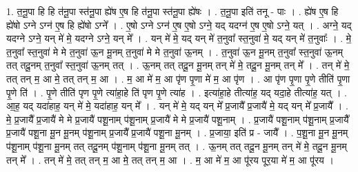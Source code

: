 \documentclass[17pt]{extarticle}
\begin{document}
1. त॒नू॒पा हि हि त॑नू॒पा स्त॑नू॒पा ह्ये॑ष ए॒ष हि त॑नू॒पा स्त॑नू॒पा ह्ये॑षः । . त॒नू॒पा इति॑ तनू - पाः । . ह्ये॑ष ए॒ष हि ह्ये॑षो ऽग्ने ऽग्न॑ ए॒ष हि ह्ये॑षो ऽग्ने᳚ । . ए॒षो ऽग्ने ऽग्न॑ ए॒ष ए॒षो ऽग्ने॒ यद् यदग्न॑ ए॒ष ए॒षो ऽग्ने॒ यत् । . अग्ने॒ यद् यदग्ने ऽग्ने॒ यन् मे॑ मे॒ यदग्ने ऽग्ने॒ यन् मे᳚ । . यन् मे॑ मे॒ यद् यन् मे॑ त॒नुवा᳚ स्त॒नुवा॑ मे॒ यद् यन् मे॑ त॒नुवाः᳚ । . मे॒ त॒नुवा᳚ स्त॒नुवा॑ मे मे त॒नुवा॑ ऊ॒न मू॒नम् त॒नुवा॑ मे मे त॒नुवा॑ ऊ॒नम् । . त॒नुवा॑ ऊ॒न मू॒नम् त॒नुवा᳚ स्त॒नुवा॑ ऊ॒नम् तत् तदू॒नम् त॒नुवा᳚ स्त॒नुवा॑ ऊ॒नम् तत् । . ऊ॒नम् तत् तदू॒न मू॒नम् तन् मे॑ मे॒ तदू॒न मू॒नम् तन् मे᳚ । . तन् मे॑ मे॒ तत् तन् म॒ आ मे॒ तत् तन् म॒ आ । . म॒ आ मे॑ म॒ आ पृ॑ण पृ॒णा मे॑ म॒ आ पृ॑ण । . आ पृ॑ण पृ॒णा पृ॒णे तीति॑ पृ॒णा पृ॒णे ति॑ । . पृ॒णे तीति॑ पृण पृ॒णे त्या॑हा॒हे ति॑ पृण पृ॒णे त्या॑ह । . इत्या॑हा॒हे तीत्या॑ह॒ यद् यदा॒हे तीत्या॑ह॒ यत् । . आ॒ह॒ यद् यदा॑हाह॒ यन् मे॑ मे॒ यदा॑हाह॒ यन् मे᳚ । . यन् मे॑ मे॒ यद् यन् मे᳚ प्र॒जायै᳚ प्र॒जायै॑ मे॒ यद् यन् मे᳚ प्र॒जायै᳚ । . मे॒ प्र॒जायै᳚ प्र॒जायै॑ मे मे प्र॒जायै॑ पशू॒नाम् प॑शू॒नाम् प्र॒जायै॑ मे मे प्र॒जायै॑ पशू॒नाम् । . प्र॒जायै॑ पशू॒नाम् प॑शू॒नाम् प्र॒जायै᳚ प्र॒जायै॑ पशू॒ना मू॒न मू॒नम् प॑शू॒नाम् प्र॒जायै᳚ प्र॒जायै॑ पशू॒ना मू॒नम् । . प्र॒जाया॒ इति॑ प्र - जायै᳚ । . प॒शू॒ना मू॒न मू॒नम् प॑शू॒नाम् प॑शू॒ना मू॒नम् तत् तदू॒नम् प॑शू॒नाम् प॑शू॒ना मू॒नम् तत् । . ऊ॒नम् तत् तदू॒न मू॒नम् तन् मे॑ मे॒ तदू॒न मू॒नम् तन् मे᳚ । . तन् मे॑ मे॒ तत् तन् म॒ आ मे॒ तत् तन् म॒ आ । . म॒ आ मे॑ म॒ आ पू॑रय पूर॒या मे॑ म॒ आ पू॑रय । \newline
\end{document}
